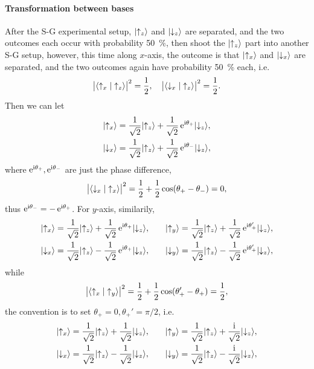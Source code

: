 \documentclass{article}
\begin{document}
\paragraph{Transformation between bases} After the S-G experimental setup, $\lvert\uparrow_z\rangle$ and $\lvert\downarrow_z\rangle$ are separated, and the two outcomes each occur with probability \qty{50}{\percent}, then shoot the $\lvert\uparrow_z\rangle$ part into another S-G setup, however, this time along $x$-axis, the outcome is that $\lvert\uparrow_x\rangle$ and $\lvert\downarrow_x\rangle$ are separated, and the two outcomes again have probability \qty{50}{\percent} each, i.e.
$$\bigl\lvert\langle\uparrow_x\vert\uparrow_z\rangle\bigr\rvert^2=\frac12,\quad\bigl\lvert\langle\downarrow_x\vert\uparrow_z\rangle\bigr\rvert^2=\frac12.$$
Then we can let
\begin{align*}
	\lvert\uparrow_x\rangle & =\frac1{\sqrt2}\lvert\uparrow_z\rangle+\frac1{\sqrt2}\mathop{}\!\mathrm{e}^{\mathrm{i}\theta_+}\lvert\downarrow_z\rangle, \\
	\lvert\downarrow_x\rangle & =\frac1{\sqrt2}\lvert\uparrow_z\rangle+\frac1{\sqrt2}\mathop{}\!\mathrm{e}^{\mathrm{i}\theta_-}\lvert\downarrow_z\rangle,
\end{align*}
where $\mathop{}\!\mathrm{e}^{\mathrm{i}\theta_+},\mathop{}\!\mathrm{e}^{\mathrm{i}\theta_-}$ are just the phase difference,$$\bigl\lvert\langle\downarrow_x\vert\uparrow_x\rangle\bigr\rvert^2=\frac12+\frac12\cos(\theta_+-\theta_-)=0,$$
thus $\mathop{}\!\mathrm{e}^{\mathrm{i}\theta_-}=-\mathop{}\!\mathrm{e}^{\mathrm{i}\theta_+}$. For $y$-axis, similarily,
\begin{align*}
	\begin{aligned}
		\lvert\uparrow_x\rangle & =\frac1{\sqrt2}\lvert\uparrow_z\rangle+\frac1{\sqrt2}\mathop{}\!\mathrm{e}^{\mathrm{i}\theta_+}\lvert\downarrow_z\rangle, \\
		\lvert\downarrow_x\rangle & =\frac1{\sqrt2}\lvert\uparrow_z\rangle-\frac1{\sqrt2}\mathop{}\!\mathrm{e}^{\mathrm{i}\theta_+}\lvert\downarrow_z\rangle,
	\end{aligned}\qquad
	\begin{aligned}
		\lvert\uparrow_y\rangle & =\frac1{\sqrt2}\lvert\uparrow_z\rangle+\frac1{\sqrt2}\mathop{}\!\mathrm{e}^{\mathrm{i}\theta_+'}\lvert\downarrow_z\rangle, \\
		\lvert\downarrow_y\rangle & =\frac1{\sqrt2}\lvert\uparrow_z\rangle-\frac1{\sqrt2}\mathop{}\!\mathrm{e}^{\mathrm{i}\theta_+'}\lvert\downarrow_z\rangle,
	\end{aligned}
\end{align*}
while
$$\bigl\lvert\langle\uparrow_x\vert\uparrow_y\rangle\bigr\rvert^2=\frac12+\frac12\cos(\theta_+'-\theta_+)=\frac12,$$
the convention is to set $\theta_+=0,\theta_+'=\pi/2$, i.e.
\begin{align*}
	\begin{aligned}
		\lvert\uparrow_x\rangle & =\frac1{\sqrt2}\lvert\uparrow_z\rangle+\frac1{\sqrt2}\lvert\downarrow_z\rangle, \\
		\lvert\downarrow_x\rangle & =\frac1{\sqrt2}\lvert\uparrow_z\rangle-\frac1{\sqrt2}\lvert\downarrow_z\rangle,
	\end{aligned}\qquad
	\begin{aligned}
		\lvert\uparrow_y\rangle & =\frac1{\sqrt2}\lvert\uparrow_z\rangle+\frac{\mathrm{i}}{\sqrt2}\lvert\downarrow_z\rangle, \\
		\lvert\downarrow_y\rangle & =\frac1{\sqrt2}\lvert\uparrow_z\rangle-\frac{\mathrm{i}}{\sqrt2}\lvert\downarrow_z\rangle,
	\end{aligned}
\end{align*}
\end{document}
